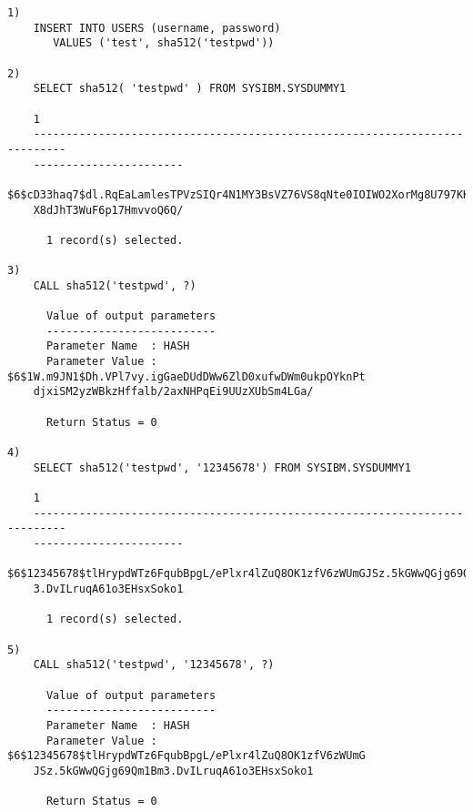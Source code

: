 \begin{verbatim}
1)
    INSERT INTO USERS (username, password)
       VALUES ('test', sha512('testpwd'))

2)
    SELECT sha512( 'testpwd' ) FROM SYSIBM.SYSDUMMY1

    1
    ---------------------------------------------------------------------------
    -----------------------
    $6$cD33haq7$dl.RqEaLamlesTPVzSIQr4N1MY3BsVZ76VS8qNte0IOIWO2XorMg8U797KKOFGm
    X8dJhT3WuF6p17HmvvoQ6Q/

      1 record(s) selected.

3)
    CALL sha512('testpwd', ?)

      Value of output parameters
      --------------------------
      Parameter Name  : HASH
      Parameter Value : $6$1W.m9JN1$Dh.VPl7vy.igGaeDUdDWw6ZlD0xufwDWm0ukpOYknPt
    djxiSM2yzWBkzHffalb/2axNHPqEi9UUzXUbSm4LGa/

      Return Status = 0

4)
    SELECT sha512('testpwd', '12345678') FROM SYSIBM.SYSDUMMY1

    1
    ---------------------------------------------------------------------------
    -----------------------
    $6$12345678$tlHrypdWTz6FqubBpgL/ePlxr4lZuQ8OK1zfV6zWUmGJSz.5kGWwQGjg69Qm1Bm
    3.DvILruqA61o3EHsxSoko1

      1 record(s) selected.

5)
    CALL sha512('testpwd', '12345678', ?)

      Value of output parameters
      --------------------------
      Parameter Name  : HASH
      Parameter Value : $6$12345678$tlHrypdWTz6FqubBpgL/ePlxr4lZuQ8OK1zfV6zWUmG
    JSz.5kGWwQGjg69Qm1Bm3.DvILruqA61o3EHsxSoko1

      Return Status = 0
\end{verbatim}
\newpage
\hypertarget{hphpmd5}{}
